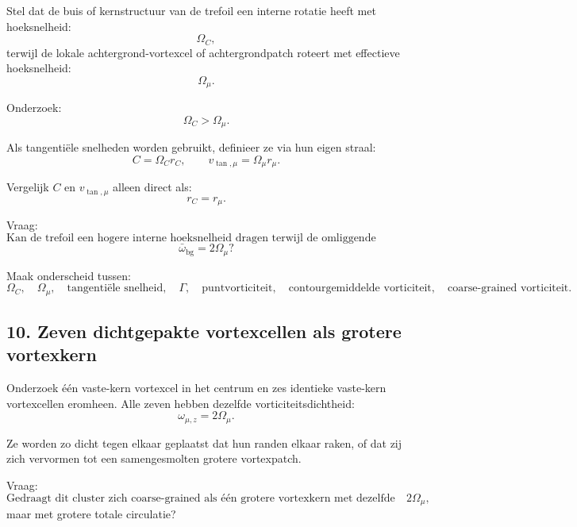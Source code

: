 \documentclass[11pt]{article}
\begin{document}
        Stel dat de buis of kernstructuur van de trefoil een interne rotatie heeft met hoeksnelheid:
        \[
            \Omega_C,
        \]
        terwijl de lokale achtergrond-vortexcel of achtergrondpatch roteert met effectieve hoeksnelheid:
        \[
            \Omega_{\mu}.
        \]
        
        Onderzoek:
        \[
            \Omega_C>\Omega_{\mu}.
        \]
        
        Als tangentiële snelheden worden gebruikt, definieer ze via hun eigen straal:
        \[
            C=\Omega_C r_C,
            \qquad
            v_{\tan,\mu}=\Omega_{\mu}r_{\mu}.
        \]
        
        Vergelijk \(C\) en \(v_{\tan,\mu}\) alleen direct als:
        \[
            r_C=r_{\mu}.
        \]
        
        Vraag:
        \[
            \text{Kan de trefoil een hogere interne hoeksnelheid dragen terwijl de omliggende coarse-grained achtergrondvorticiteit gelijk blijft aan}
        \]
        \[
            \bar{\omega}_{\mathrm{bg}}=2\Omega_{\mu}?
        \]
        
        Maak onderscheid tussen:
        \[
            \Omega_C,
            \quad
            \Omega_{\mu},
            \quad
            \text{tangentiële snelheid},
            \quad
            \Gamma,
            \quad
            \text{puntvorticiteit},
            \quad
            \text{contourgemiddelde vorticiteit},
            \quad
            \text{coarse-grained vorticiteit}.
        \]
    
    \subsection{10. Zeven dichtgepakte vortexcellen als grotere vortexkern}
        
        Onderzoek één vaste-kern vortexcel in het centrum en zes identieke vaste-kern vortexcellen eromheen. Alle zeven hebben dezelfde vorticiteitsdichtheid:
        \[
            \omega_{\mu,z}=2\Omega_{\mu}.
        \]
        
        Ze worden zo dicht tegen elkaar geplaatst dat hun randen elkaar raken, of dat zij zich vervormen tot een samengesmolten grotere vortexpatch.
        
        Vraag:
        \[
            \text{Gedraagt dit cluster zich coarse-grained als één grotere vortexkern met dezelfde effectieve vorticiteitsdichtheid }2\Omega_{\mu},
        \]
        maar met grotere totale circulatie?
        
\end{document}
